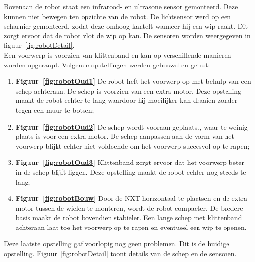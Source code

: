 \documentclass[eind]{penoverslag}
\begin{document}
Bovenaan de robot staat een infrarood- en ultrasone sensor gemonteerd. Deze kunnen niet bewegen ten opzichte van de robot. De lichtsensor werd op een scharnier gemonteerd, zodat deze omhoog kantelt wanneer hij een wip raakt. Dit zorgt ervoor dat de robot vlot de wip op kan. De sensoren worden weergegeven in figuur~\ref{fig:robotDetail}.\\

Een voorwerp is voorzien van klittenband en kan op verschillende manieren worden opgeraapt. Volgende opstellingen werden gebouwd en getest:

\begin{enumerate}
\item \textbf{Figuur~\ref{fig:robotOud1} } De robot heft het voorwerp op met behulp van een schep achteraan. De schep is voorzien van een extra motor. Deze opstelling maakt de robot echter te lang waardoor hij moeilijker kan draaien zonder tegen een muur te botsen;
\item \textbf{Figuur~\ref{fig:robotOud2} } De schep wordt vooraan geplaatst, waar te weinig plaats is voor een extra motor. De schep aanpassen aan de vorm van het voorwerp blijkt echter niet voldoende om het voorwerp succesvol op te rapen;
\item \textbf{Figuur~\ref{fig:robotOud3} } Klittenband zorgt ervoor dat het voorwerp beter in de schep blijft liggen. Deze opstelling maakt de robot echter nog steeds te lang;
\item \textbf{Figuur~\ref{fig:robotBouw} } Door de \textsc{NXT} horizontaal te plaatsen en de extra motor tussen de wielen te monteren, wordt de robot compacter. De bredere basis maakt de robot bovendien stabieler. Een lange schep met klittenband achteraan laat toe het voorwerp op te rapen en eventueel een wip te openen.
\end{enumerate}

Deze laatste opstelling gaf voorlopig nog geen problemen. Dit is de huidige opstelling. Figuur~\ref{fig:robotDetail} toont details van de schep en de sensoren.
\end{document}
